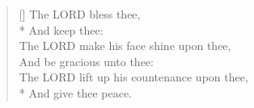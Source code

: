 \documentclass[MAIN]{subfiles}
\begin{document}
\begin{verse}[\versewidth]
The {\hge LORD} bless thee,\\*
\vin And keep thee:\\
The {\hge LORD} make his face shine upon thee,\\
\vin And be gracious unto thee:\\
The {\hge LORD} lift up his countenance upon thee,\\*
\vin And give thee peace.
\end{verse}
\end{document}
